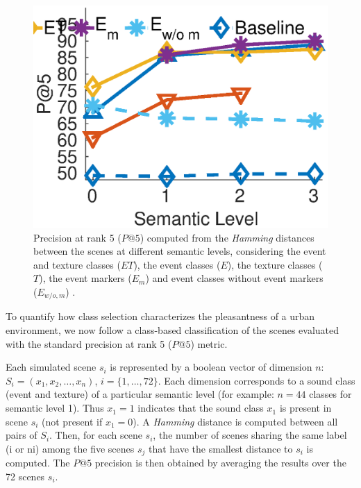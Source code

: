 \documentclass[twoside,twocolumn]{article}
\begin{document}
\begin{figure}[t]
\begin{center}
\includegraphics[width=\columnwidth]{../gfxMatlab/pa5_1.eps}
\caption{\label{fig:pa5} Precision at rank 5 ($P@5$) computed from the \textit{Hamming} distances between the scenes at different semantic levels, considering the event and texture classes ($ET$), the event classes ($E$), the texture classes ($T$), the event markers ($E_m$) and event classes without event markers ($E_{w/o,m}$) .}
\end{center}
\end{figure}

To quantify how class selection characterizes the pleasantness of a urban environment, we now follow a class-based classification of the scenes evaluated with the standard precision at rank 5 ($P@5$) metric. 

Each simulated scene $s_i$ is represented by a boolean vector of dimension $n$: $S_i = (x_1, x_2, \ldots{}, x_{n})$, $i=\lbrace 1, \ldots, 72 \rbrace$. Each dimension corresponds to a sound class (event and texture) of a particular semantic level (for example: $n=44$ classes for semantic level 1). Thus $x_1 = 1$ indicates that the sound class $x_1$ is present in scene $s_i$ (not present if $x_1=0$). A \textit{Hamming} distance is computed between all pairs of $S_i$. Then, for each scene $s_i$, the number of scenes sharing the same label (i or ni) among the five scenes $s_j$ that have the smallest distance to $s_i$ is computed. The $P@5$ precision is then obtained by averaging the results over the 72 scenes $s_i$.
\end{document}
